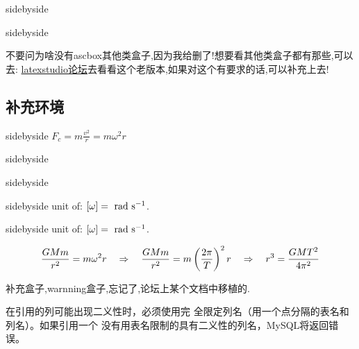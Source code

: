 \begin{tcblisting}{sidebyside}
    
\end{tcblisting}

\begin{tcblisting}{sidebyside}
    
\end{tcblisting}

不要问为啥没有ascbox其他类盒子,因为我给删了!想要看其他类盒子都有那些,可以去:
\href{https://www.latexstudio.net/index/details/index/mid/2314.html}{latexstudio论坛}去看看这个老版本,如果对这个有要求的话,可以补充上去!





\subsection{补充环境}

\begin{tcblisting}{sidebyside}
$\boxed{ F_c = m\frac{v^2}{r} = m\omega^2r}$
\end{tcblisting}


\begin{tcblisting}{sidebyside}
\end{tcblisting}
%
\begin{tcblisting}{sidebyside}
\end{tcblisting}
%
\begin{tcblisting}{sidebyside}
\cmt unit of: $[\omega] = \radps$.
\end{tcblisting}


\begin{tcblisting}{sidebyside}
\sol  unit of: $[\omega] = \radps$.
\end{tcblisting}
\begin{tcblisting}{}
\solc
\begin{equation*}
\frac{GMm}{r^2} = m \omega^2 r \RA \frac{GMm}{r^2} = m\left(\frac{2\pi}{T}\right)^2 r \RA r^3 = \frac{GMT^2}{4\pi^2}
\end{equation*}
\end{tcblisting}

\begin{tcblisting}{}
\end{tcblisting}
补充盒子,warnning盒子,忘记了,论坛上某个文档中移植的.
\begin{warning}[title={{\color{mred} \faDropbox} 完全限定列名：\ }]
在引用的列可能出现二义性时，必须使用完
全限定列名（用一个点分隔的表名和列名）。如果引用一个
没有用表名限制的具有二义性的列名，MySQL将返回错误。
\end{warning}

